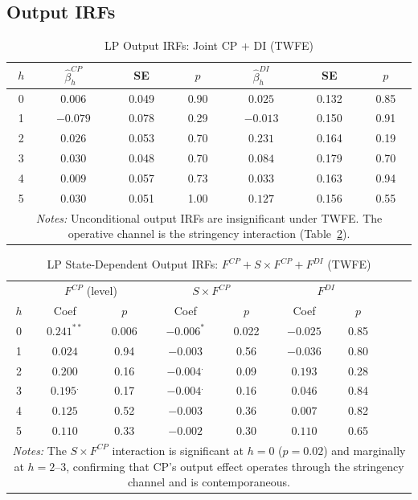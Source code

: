\documentclass[12pt, a4paper]{article}
\begin{document}
\subsection{Output IRFs}

\begin{table}[htbp]
\centering
\caption{LP Output IRFs: Joint CP + DI (TWFE)}
\label{tab:lp_output}
\small
\begin{tabular}{ccccccc}
\toprule
$h$ & $\hat{\beta}_h^{CP}$ & SE & $p$ & $\hat{\beta}_h^{DI}$ & SE & $p$ \\
\midrule
0 & $0.006$  & 0.049 & 0.90 & $0.025$  & 0.132 & 0.85 \\
1 & $-0.079$ & 0.078 & 0.29 & $-0.013$ & 0.150 & 0.91 \\
2 & $0.026$  & 0.053 & 0.70 & $0.231$  & 0.164 & 0.19 \\
3 & $0.030$  & 0.048 & 0.70 & $0.084$  & 0.179 & 0.70 \\
4 & $0.009$  & 0.057 & 0.73 & $0.033$  & 0.163 & 0.94 \\
5 & $0.030$  & 0.051 & 1.00 & $0.127$  & 0.156 & 0.55 \\
\bottomrule
\multicolumn{7}{p{11cm}}{\footnotesize \textit{Notes:} Unconditional output IRFs are insignificant under TWFE. The operative channel is the stringency interaction (Table~\ref{tab:lp_state_dep}).} \\
\end{tabular}
\end{table}

\begin{table}[htbp]
\centering
\caption{LP State-Dependent Output IRFs: $F^{CP} + S \times F^{CP} + F^{DI}$ (TWFE)}
\label{tab:lp_state_dep}
\small
\begin{tabular}{ccccccccc}
\toprule
 & \multicolumn{2}{c}{$F^{CP}$ (level)} & \multicolumn{2}{c}{$S \times F^{CP}$} & \multicolumn{2}{c}{$F^{DI}$} \\
$h$ & Coef & $p$ & Coef & $p$ & Coef & $p$ \\
\midrule
0 & $0.241^{**}$  & 0.006 & $-0.006^{*}$ & 0.022 & $-0.025$ & 0.85 \\
1 & $0.024$       & 0.94  & $-0.003$     & 0.56  & $-0.036$ & 0.80 \\
2 & $0.200$       & 0.16  & $-0.004^{.}$ & 0.09  & $0.193$  & 0.28 \\
3 & $0.195^{.}$   & 0.17  & $-0.004^{.}$ & 0.16  & $0.046$  & 0.84 \\
4 & $0.125$       & 0.52  & $-0.003$     & 0.36  & $0.007$  & 0.82 \\
5 & $0.110$       & 0.33  & $-0.002$     & 0.30  & $0.110$  & 0.65 \\
\bottomrule
\multicolumn{9}{p{13cm}}{\footnotesize \textit{Notes:} The $S \times F^{CP}$ interaction is significant at $h=0$ ($p = 0.02$) and marginally at $h=2$--$3$, confirming that CP's output effect operates through the stringency channel and is contemporaneous.} \\
\end{tabular}
\end{table}
\end{document}

